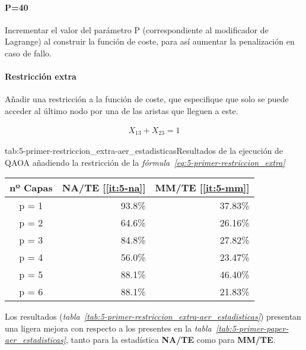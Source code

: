 \paragraph{P=40}
Incrementar el valor del parámetro P (correspondiente al modificador de Lagrange)
al construir la función de coste, para así aumentar la penalización en caso de fallo.

\paragraph{Restricción extra}
Añadir una restricción a la función de coste, que especifique que solo se puede acceder al último nodo por una de las aristas que lleguen a este.

\begin{align}\label{eq:5-primer-restriccion_extra}
  X_{13} + X_{23} = 1
\end{align}

\begin{table}[htbp]{tab:5-primer-restriccion_extra-aer_estadisticas}{Resultados de la ejecución de QAOA añadiendo la restricción de la \textit{fórmula~\ref{eq:5-primer-restriccion_extra}}}
  \centering
  \begin{tabular}{|c|r|r|}
    \hline
    \textbf{nº Capas} & \textbf{NA/TE} [\ref{it:5-na}] & \textbf{MM/TE} [\ref{it:5-mm}] \\ \hline
    p = 1 & 93.8\% & 37.83\% \\ \hline
    p = 2 & 64.6\% & 26.16\% \\ \hline
    p = 3 & 84.8\% & 27.82\% \\ \hline
    p = 4 & 56.0\% & 23.47\% \\ \hline
    p = 5 & 88.1\% & 46.40\% \\ \hline
    p = 6 & 88.1\% & 21.83\% \\ \hline
  \end{tabular}
\end{table}

Los resultados (\textit{tabla~\ref{tab:5-primer-restriccion_extra-aer_estadisticas}}) presentan una ligera mejora con respecto a los presentes en la \textit{tabla~\ref{tab:5-primer-paper-aer_estadisticas}}, tanto para la estadística \textbf{NA/TE} como para \textbf{MM/TE}.

